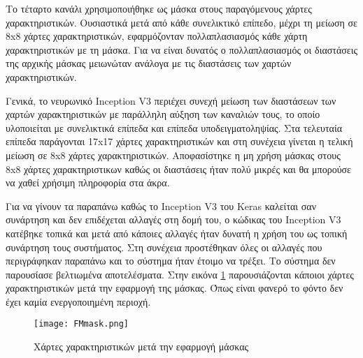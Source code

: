 Το τέταρτο κανάλι χρησιμοποιήθηκε ως μάσκα στους παραγόμενους χάρτες χαρακτηριστικών. Ουσιαστικά μετά από κάθε συνελικτικό επίπεδο, μέχρι τη μείωση σε 8x8 χάρτες χαρακτηριστικών, εφαρμόζονταν πολλαπλασιασμός κάθε χάρτη χαρακτηριστικών με τη μάσκα. Για να είναι δυνατός ο πολλαπλασιασμός οι διαστάσεις της αρχικής μάσκας μειωνώταν ανάλογα με τις διαστάσεις των χαρτών χαρακτηριστικών. 

Γενικά, το νευρωνικό Inception V3 περιέχει συνεχή μείωση των διαστάσεων των χαρτών χαρακτηριστικών με παράλληλη αύξηση των καναλιών τους, το οποίο υλοποιείται με συνελικτικά επίπεδα και επίπεδα υποδειγματοληψίας. Στα τελευταία επίπεδα παράγονται 17x17 χάρτες χαρακτηριστικών και στη συνέχεια γίνεται η τελική μείωση σε 8x8 χάρτες χαρακτηριστικών. Αποφασίστηκε η μη χρήση μάσκας στους 8x8 χάρτες χαρακτηριστικων καθώς οι διαστάσεις ήταν πολύ μικρές και θα μπορούσε να χαθεί χρήσιμη πληροφορία στα άκρα.



Για να γίνουν τα παραπάνω καθώς το Inception V3 του Keras καλείται σαν συνάρτηση και δεν επιδέχεται αλλαγές στη δομή του, ο κώδικας του Inception V3 κατέβηκε τοπικά και μετά από κάποιες αλλαγές ήταν δυνατή η χρήση του ως τοπική συνάρτηση τους συστήματος. Στη συνέχεια προστέθηκαν όλες οι αλλαγές που περιγράφηκαν παραπάνω και το σύστημα ήταν έτοιμο να τρέξει. Το σύστημα δεν παρουσίασε βελτιωμένα αποτελέσματα. Στην εικόνα \ref{figure:masked} παρουσιάζονται κάποιοι χάρτες χαρακτηριστικών μετά την εφαρμογή της μάσκας. Όπως είναι φανερό το φόντο δεν έχει καμία ενεργοποιημένη περιοχή.

\begin{figure}[!h]
    \centering
      \texttt{[image: FMmask.png]} \caption{Χάρτες χαρακτηριστικών μετά την εφαρμογή μάσκας}
\label{figure:masked}  
\end{figure}



